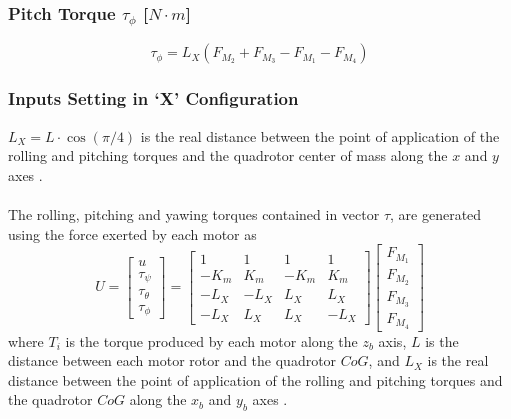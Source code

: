 \subsubsection{Pitch Torque $\tau_{\phi}$ [$N\cdot m$]}
\begin{equation}
\tau_{\phi} = L_{X}(F_{M_2}+F_{M_3}-F_{M_1}-F_{M_4})
\end{equation}

\subsubsection{Inputs Setting in `X' Configuration}
$L_{X} = L\cdot \cos\left(\pi/4\right)$ is the real distance between the point of application of the rolling and pitching torques and the quadrotor center of mass along the $x$ and $y$ axes \cite{Faessler2016}.
\\\\
The rolling, pitching and yawing torques contained in vector $\tau$, are generated using the force exerted by each motor as 
\begin{equation}
	U = \begin{bmatrix}
	u\\[5pt]
	\tau_{\psi}\\[5pt]
	\tau_{\theta}\\[5pt]
	\tau_{\phi}
	\end{bmatrix} = \begin{bmatrix}
	1 & 1 & 1 & 1 \\[5pt]
	-K_{m} & K_{m} & -K_{m} & K_{m}\\[5pt]
	-L_{X} & -L_{X} & L_{X} & L_{X}\\[5pt]
	-L_{X} & L_{X} & L_{X} & -L_{X}
							\end{bmatrix}
\begin{bmatrix}
F_{M_1}\\[5pt]
F_{M_2}\\[5pt]
F_{M_3}\\[5pt]
F_{M_4}
\end{bmatrix}
	\label{ec:U_X}						
\end{equation}
where $ T_{i} $ is the torque produced by each motor along the $z_{b}$ axis, $L$ is the distance between each motor rotor and the quadrotor $CoG$, and $L_X$ is the real distance between the point of application of the rolling and pitching torques and the quadrotor $CoG$ along the $x_b$ and $y_b$ axes \cite{Faessler2016}.\\\\



